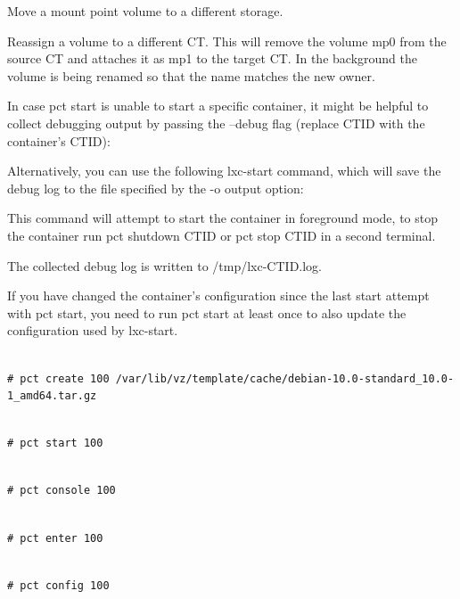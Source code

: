 Move a mount point volume to a different storage.

Reassign a volume to a different CT. This will remove the volume mp0 from the source CT and attaches it as mp1 to the target CT. In the background the volume is being renamed so that the name matches the new owner.

In case pct start is unable to start a specific container, it might be helpful to collect debugging output by passing the --debug flag (replace CTID with the container’s CTID):

Alternatively, you can use the following lxc-start command, which will save the debug log to the file specified by the -o output option:

This command will attempt to start the container in foreground mode, to stop the container run pct shutdown CTID or pct stop CTID in a second terminal.

The collected debug log is written to /tmp/lxc-CTID.log.

If you have changed the container’s configuration since the last start attempt with pct start, you need to run pct start at least once to also update the configuration used by lxc-start.

\begin{lstlisting}

# pct create 100 /var/lib/vz/template/cache/debian-10.0-standard_10.0-1_amd64.tar.gz

\end{lstlisting}

\begin{lstlisting}

# pct start 100

\end{lstlisting}

\begin{lstlisting}

# pct console 100

\end{lstlisting}

\begin{lstlisting}

# pct enter 100

\end{lstlisting}

\begin{lstlisting}

# pct config 100

\end{lstlisting}

